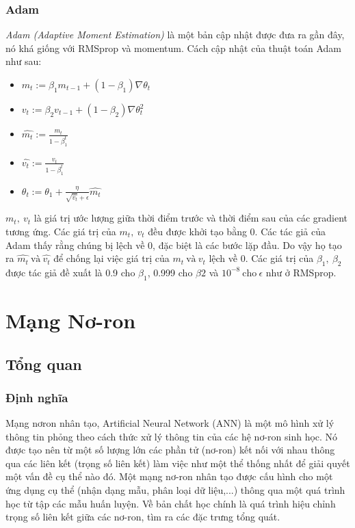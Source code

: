 \subsection{Adam}
 \textit{Adam (Adaptive Moment Estimation)}\cite{kingma2014adam} là một bản cập nhật được đưa ra gần đây, nó khá giống với RMSprop và momentum. Cách cập nhật của thuật toán Adam như sau:
\begin{itemize}
\item[]  $m_t := \beta_1 m_{t-1} + (1-\beta_1) \nabla\theta_{t}$
\item[] $v_t := \beta_2 v_{t-1} + (1-\beta_2) \nabla\theta^2_{t}$
\item[] $ \widehat{m_t} := \frac{m_t}{1-\beta_1^{t}}$
\item[] $ \widehat{v_t} := \frac{v_t}{1-\beta_1^{t}} $
\item[] $\theta_t := \theta_1 + \frac{\eta }{\sqrt{\widehat{v_t}} +\epsilon}\widehat{m_t}$ 
\end{itemize}
$m_t,~v_t$ là giá trị ước lượng giữa thời điểm trước và thời điểm sau của các gradient tương ứng. Các giá trị của $m_t,~v_t$ đều được khởi tạo bằng 0. Các tác giả của Adam thấy rằng chúng bị lệch về 0, đặc biệt là các bước lặp đầu. Do vậy họ tạo ra $\widehat{m_t}~\text{và}~\widehat{v_t}$ để chống lại việc giá trị của $m_t ~\text{và}~ v_t$ lệch về 0. Các giá trị của $\beta_1,~\beta_2$ được tác giả đề xuất là 0.9 cho $\beta_1$, 0.999 cho $\beta2$  và $10^{-8} ~\text{cho}~ \epsilon$ như ở RMSprop.

\chapter{Mạng Nơ-ron}
\section{Tổng quan}
\subsection{Định nghĩa}
Mạng nơron nhân tạo, Artificial Neural Network (ANN) là một mô hình xử lý thông tin phỏng theo cách thức xử lý thông tin của các hệ nơ-ron sinh học. Nó được tạo nên từ một số lượng lớn các phần tử (nơ-ron) kết nối với nhau thông qua các liên kết (trọng số liên kết) làm việc như một thể thống nhất để giải quyết một vấn đề cụ thể nào đó. Một mạng nơ-ron nhân tạo được cấu hình cho một ứng dụng cụ thể (nhận dạng mẫu, phân loại dữ liệu,...) thông qua một quá trình học từ tập các mẫu huấn luyện. Về bản chất học chính là quá trình hiệu chỉnh trọng số liên kết giữa các nơ-ron, tìm ra các đặc trưng tổng quát.

